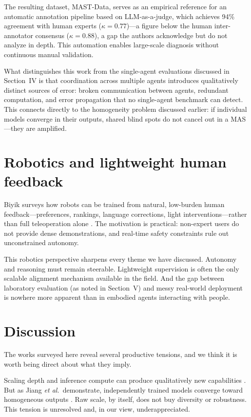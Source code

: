 \documentclass[conference]{IEEEtran}
\begin{document}
The resulting dataset, MAST-Data, serves as an empirical reference for an automatic annotation pipeline based on LLM-as-a-judge, which achieves 94\% agreement with human experts ($\kappa = 0.77$)---a figure below the human inter-annotator consensus ($\kappa = 0.88$), a gap the authors acknowledge but do not analyze in depth. This automation enables large-scale diagnosis without continuous manual validation.

What distinguishes this work from the single-agent evaluations discussed in Section~IV is that coordination across multiple agents introduces qualitatively distinct sources of error: broken communication between agents, redundant computation, and error propagation that no single-agent benchmark can detect. This connects directly to the homogeneity problem discussed earlier: if individual models converge in their outputs, shared blind spots do not cancel out in a MAS---they are amplified.

\section{Robotics and lightweight human feedback}
Biyik surveys how robots can be trained from natural, low-burden human feedback---preferences, rankings, language corrections, light interventions---rather than full teleoperation alone \cite{biyik2025robots}. The motivation is practical: non-expert users do not provide dense demonstrations, and real-time safety constraints rule out unconstrained autonomy.

This robotics perspective sharpens every theme we have discussed. Autonomy and reasoning must remain steerable. Lightweight supervision is often the only scalable alignment mechanism available in the field. And the gap between laboratory evaluation (as noted in Section~V) and messy real-world deployment is nowhere more apparent than in embodied agents interacting with people.

\section{Discussion}
The works surveyed here reveal several productive tensions, and we think it is worth being direct about what they imply.

Scaling depth and inference compute can produce qualitatively new capabilities \cite{wang2025thousand,ellis2026inference}. But as Jiang \emph{et al.}\ demonstrate, independently trained models converge toward homogeneous outputs \cite{jiang2025hivemind}. Raw scale, by itself, does not buy diversity or robustness. This tension is unresolved and, in our view, underappreciated.
\end{document}
